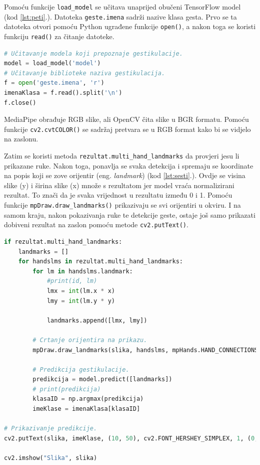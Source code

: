 \documentclass[]{foi} %
\begin{document}
\newpage
Pomoću funkcije \texttt{load\_model} se učitava unaprijed obučeni TensorFlow model (kod \ref{lst:peti}.).
Datoteka \texttt{geste.imena} sadrži nazive klasa gesta. Prvo se ta datoteka otvori pomoću Python ugrađene funkcije \texttt{open()}, a nakon toga se koristi funkciju \texttt{read()} za čitanje datoteke.

\begin{lstlisting}[language=Python, caption={[Inicijalizacija TensorFlowa] Inicijalizacija TensorFlowa}, label=lst:peti]
# Učitavanje modela koji prepoznaje gestikulacije.
model = load_model('model')
# Učitavanje biblioteke naziva gestikulacija.
f = open('geste.imena', 'r')
imenaKlasa = f.read().split('\n')
f.close()
\end{lstlisting}

MediaPipe obrađuje RGB slike, ali OpenCV čita slike u BGR formatu. Pomoću funkcije \texttt{cv2.cvtCOLOR()} se sadržaj pretvara se u RGB format kako bi se vidjelo na zaslonu.

Zatim se koristi metoda \texttt{rezultat.multi\_hand\_landmarks} da provjeri jesu li prikazane ruke.
Nakon toga, ponavlja se svaka detekcija i spremaju se koordinate na popis koji se zove orijentir (eng. \textit{landmark}) (kod \ref{lst:sesti}.).
Ovdje se visina slike (y) i širina slike (x) množe s rezultatom jer model vraća normalizirani rezultat. To znači da je svaka vrijednost u rezultatu između 0 i 1.
Pomoću funkcije \texttt{mpDraw.draw\_landmarks()} prikazivaju se svi orijentiri u okviru. I na samom kraju, nakon pokazivanja ruke te detekcije geste, ostaje još samo prikazati dobiveni rezultat na zaslon pomoću metode \texttt{cv2.putText()}.

\begin{lstlisting}[language=Python, caption={[Prepoznavanje geste] Prepoznavanje geste}, label=lst:sesti]
if rezultat.multi_hand_landmarks:
    landmarks = []
    for handslms in rezultat.multi_hand_landmarks:
        for lm in handslms.landmark:
            #print(id, lm)
            lmx = int(lm.x * x)
            lmy = int(lm.y * y)

            landmarks.append([lmx, lmy])

        # Crtanje orijentira na prikazu.
        mpDraw.draw_landmarks(slika, handslms, mpHands.HAND_CONNECTIONS)

        # Predikcija gestikulacije.
        predikcija = model.predict([landmarks])
        # print(predikcija)
        klasaID = np.argmax(predikcija)
        imeKlase = imenaKlasa[klasaID]

# Prikazivanje predikcije.
cv2.putText(slika, imeKlase, (10, 50), cv2.FONT_HERSHEY_SIMPLEX, 1, (0, 0, 255), 2, cv2.LINE_AA)

cv2.imshow("Slika", slika)
\end{lstlisting}
\end{document}
